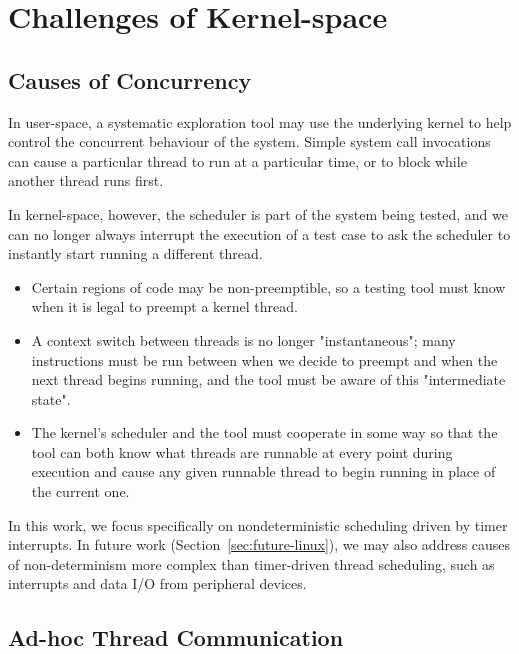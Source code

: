 \section{Challenges of Kernel-space}

\subsection{Causes of Concurrency}

In user-space, a systematic exploration tool may use the underlying kernel to help control the concurrent behaviour of the system. Simple system call invocations can cause a particular thread to run at a particular time, or to block while another thread runs first.

In kernel-space, however, the scheduler is part of the system being tested, and we can no longer always interrupt the execution of a test case to ask the scheduler to instantly start running a different thread.
\begin{itemize}
	\item Certain regions of code may be non-preemptible, so a testing tool must know when it is legal to preempt a kernel thread.
	\item A context switch between threads is no longer "instantaneous"; many instructions must be run between when we decide to preempt and when the next thread begins running, and the tool must be aware of this "intermediate state". %
	\item The kernel's scheduler and the tool must cooperate in some way so that the tool can both know what threads are runnable at every point during execution and cause any given runnable thread to begin running in place of the current one.
\end{itemize}

In this work, we focus specifically on nondeterministic scheduling driven by timer interrupts. In future work (Section~\ref{sec:future-linux}), we may also address causes of non-determinism more complex than timer-driven thread scheduling, such as interrupts and data I/O from peripheral devices.

\subsection{Ad-hoc Thread Communication}

